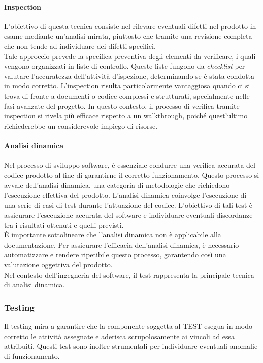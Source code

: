 \paragraph{Inspection}
L'obiettivo di questa tecnica consiste nel rilevare eventuali difetti nel prodotto in esame mediante un'analisi mirata, piuttosto che tramite una revisione completa che non tende ad individuare dei difetti specifici. \\
Tale approccio prevede la specifica preventiva degli elementi da verificare, i quali vengono organizzati in liste di controllo.
Queste liste fungono da \textit{checklist} per valutare l'accuratezza dell'attività d'ispezione, determinando se è stata condotta in modo corretto.
L'inspection risulta particolarmente vantaggiosa quando ci si trova di fronte a documenti o codice complessi e strutturati, specialmente nelle fasi avanzate del progetto. In questo contesto, il processo di verifica tramite inspection si rivela più efficace rispetto a un walkthrough, poiché quest'ultimo richiederebbe un considerevole impiego di risorse.

\paragraph{Analisi dinamica} 
Nel processo di sviluppo software, è essenziale condurre una verifica accurata del codice prodotto al fine di garantirne il corretto funzionamento. Questo processo si avvale dell'analisi dinamica, una categoria di metodologie che richiedono l'esecuzione effettiva del prodotto.
L'analisi dinamica coinvolge l'esecuzione di una serie di casi di test durante l'attuazione del codice. L'obiettivo di tali test è assicurare l'esecuzione accurata del software e individuare eventuali discordanze tra i risultati ottenuti e quelli previsti. \\
È importante sottolineare che l'analisi dinamica non è applicabile alla documentazione.
Per assicurare l'efficacia dell'analisi dinamica, è necessario automatizzare e rendere ripetibile questo processo, garantendo così una valutazione oggettiva del prodotto. \\
Nel contesto dell'ingegneria del software, il test rappresenta la principale tecnica di analisi dinamica.

\subsubsection{Testing}
\label{subsec:Testing}
Il testing mira a garantire che la componente soggetta al TEST esegua in modo corretto le attività assegnate e aderisca scrupolosamente ai vincoli ad essa attribuiti. Questi test sono inoltre strumentali per individuare eventuali anomalie di funzionamento.

